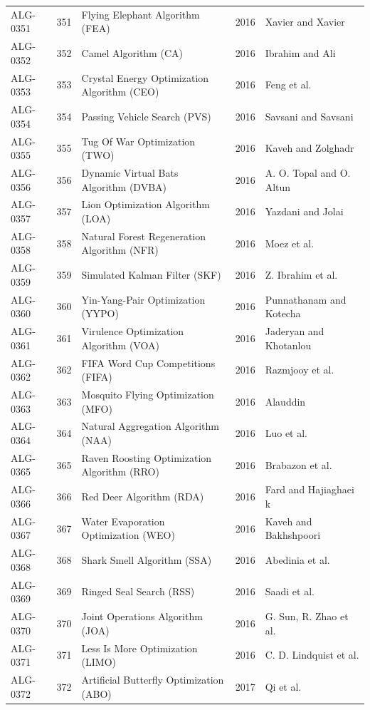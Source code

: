 \documentclass[8pt]{article}
\begin{document}
\begin{landscape}
\begin{longtable}{P{1.7cm}rP{10.0cm}rP{7.2cm}}
ALG-0351 & 351 & Flying Elephant Algorithm (FEA) & 2016 & Xavier and Xavier \\
ALG-0352 & 352 & Camel Algorithm (CA) & 2016 & Ibrahim and Ali \\
ALG-0353 & 353 & Crystal Energy Optimization Algorithm (CEO) & 2016 & Feng et al. \\
ALG-0354 & 354 & Passing Vehicle Search (PVS) & 2016 & Savsani and Savsani \\
ALG-0355 & 355 & Tug Of War Optimization (TWO) & 2016 & Kaveh and Zolghadr \\
ALG-0356 & 356 & Dynamic Virtual Bats Algorithm (DVBA) & 2016 & A. O. Topal and O. Altun \\
ALG-0357 & 357 & Lion Optimization Algorithm (LOA) & 2016 & Yazdani and Jolai \\
ALG-0358 & 358 & Natural Forest Regeneration Algorithm (NFR) & 2016 & Moez et al. \\
ALG-0359 & 359 & Simulated Kalman Filter (SKF) & 2016 & Z. Ibrahim et al. \\
ALG-0360 & 360 & Yin-Yang-Pair Optimization (YYPO) & 2016 & Punnathanam and Kotecha \\
ALG-0361 & 361 & Virulence Optimization Algorithm (VOA) & 2016 & Jaderyan and Khotanlou \\
ALG-0362 & 362 & FIFA Word Cup Competitions (FIFA) & 2016 & Razmjooy et al. \\
ALG-0363 & 363 & Mosquito Flying Optimization (MFO) & 2016 & Alauddin \\
ALG-0364 & 364 & Natural Aggregation Algorithm (NAA) & 2016 & Luo et al. \\
ALG-0365 & 365 & Raven Roosting Optimization Algorithm (RRO) & 2016 & Brabazon et al. \\
ALG-0366 & 366 & Red Deer Algorithm (RDA) & 2016 & Fard and Hajiaghaei k \\
ALG-0367 & 367 & Water Evaporation Optimization (WEO) & 2016 & Kaveh and Bakhshpoori \\
ALG-0368 & 368 & Shark Smell Algorithm (SSA) & 2016 & Abedinia et al. \\
ALG-0369 & 369 & Ringed Seal Search (RSS) & 2016 & Saadi et al. \\
ALG-0370 & 370 & Joint Operations Algorithm (JOA) & 2016 & G. Sun, R. Zhao et al. \\
ALG-0371 & 371 & Less Is More Optimization (LIMO) & 2016 & C. D. Lindquist et al. \\
ALG-0372 & 372 & Artificial Butterfly Optimization (ABO) & 2017 & Qi et al. \\

\end{longtable}
\end{landscape}
\end{document}
